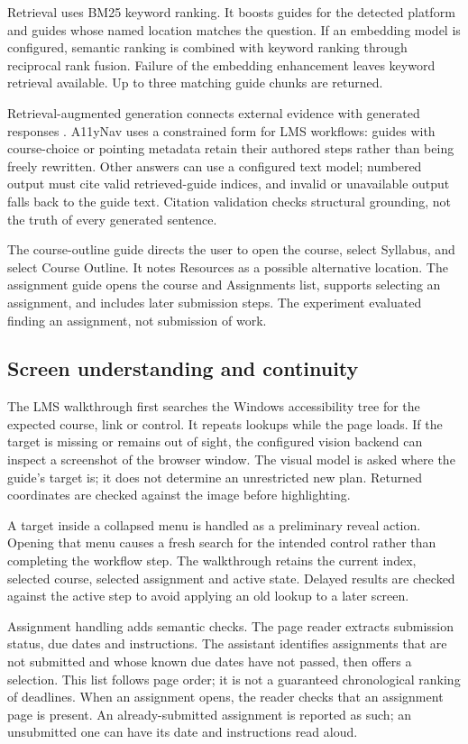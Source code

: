 \documentclass[11pt,a4paper]{article}
\begin{document}
Retrieval uses BM25 keyword ranking. It boosts guides for the detected platform and guides whose named location matches the question. If an embedding model is configured, semantic ranking is combined with keyword ranking through reciprocal rank fusion. Failure of the embedding enhancement leaves keyword retrieval available. Up to three matching guide chunks are returned.

Retrieval-augmented generation connects external evidence with generated responses \cite{lewis}. A11yNav uses a constrained form for LMS workflows: guides with course-choice or pointing metadata retain their authored steps rather than being freely rewritten. Other answers can use a configured text model; numbered output must cite valid retrieved-guide indices, and invalid or unavailable output falls back to the guide text. Citation validation checks structural grounding, not the truth of every generated sentence.

The course-outline guide directs the user to open the course, select Syllabus, and select Course Outline. It notes Resources as a possible alternative location. The assignment guide opens the course and Assignments list, supports selecting an assignment, and includes later submission steps. The experiment evaluated finding an assignment, not submission of work.

\subsection{Screen understanding and continuity}
The LMS walkthrough first searches the Windows accessibility tree for the expected course, link or control. It repeats lookups while the page loads. If the target is missing or remains out of sight, the configured vision backend can inspect a screenshot of the browser window. The visual model is asked where the guide's target is; it does not determine an unrestricted new plan. Returned coordinates are checked against the image before highlighting.

A target inside a collapsed menu is handled as a preliminary reveal action. Opening that menu causes a fresh search for the intended control rather than completing the workflow step. The walkthrough retains the current index, selected course, selected assignment and active state. Delayed results are checked against the active step to avoid applying an old lookup to a later screen.

Assignment handling adds semantic checks. The page reader extracts submission status, due dates and instructions. The assistant identifies assignments that are not submitted and whose known due dates have not passed, then offers a selection. This list follows page order; it is not a guaranteed chronological ranking of deadlines. When an assignment opens, the reader checks that an assignment page is present. An already-submitted assignment is reported as such; an unsubmitted one can have its date and instructions read aloud.
\end{document}
